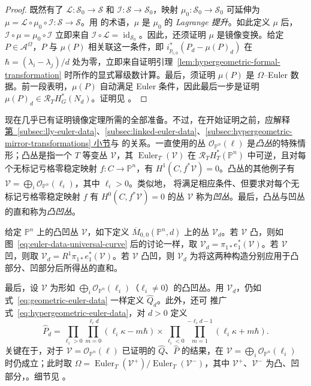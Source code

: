 \begin{proof}
既然有了 $\mathcal L:\mathcal S_0\to\mathcal S$ 和 $\mathcal I:\mathcal S\to\mathcal S_0$，映射 $\mu_0:\mathcal S_0\to\mathcal S_0$ 可延伸为 $\mu=\mathcal L\circ\mu_0\circ\mathcal I:\mathcal S\to\mathcal S$。用  的术语，$\mu$ 是 $\mu_0$ 的 \emph{Lagrange 提升}。如此定义 $\mu$ 后，$\mathcal I\circ\mu=\mu_0\circ\mathcal I$ 立即来自 $\mathcal I\circ\mathcal L=\operatorname{id}_{\mathcal S_0}$。因此，还须证明 $\mu$ 是镜像变换。给定 $P\in\mathcal A^\Omega$，$P$ 与 $\mu(P)$ 相关联这一条件，即 $i_{p_{i,0}}^*(P_d-\mu(P)_d)$ 在 $\hbar=(\lambda_i-\lambda_j)/d$ 处为零，立即来自证明引理~\ref{lem:hypergeometric-formal-transformation} 时所作的显式幂级数计算。最后，须证明 $\mu(P)$ 是 $\Omega$--Euler 数据。前一段表明，$\mu(P)$ 自动满足 Euler 条件，因此最后一步是证明 $\mu(P)_d\in\mathcal R_TH_G^*(N_d)$。证明见 。
\end{proof}

现在几乎已有证明镜像定理所需的全部准备。不过，在开始证明之前，应解释\hyperref[subsec:lly-euler-data]{第~\ref*{subsec:lly-euler-data}}、\hyperref[subsec:linked-euler-data]{\ref*{subsec:linked-euler-data}}、\hyperref[subsec:hypergeometric-mirror-transformations]{\ref*{subsec:hypergeometric-mirror-transformations} 小节}与  的关系。一直使用的丛 $\mathcal O_{\mathbb P^n}(\ell)$ 是\emph{凸丛}的特殊情形；凸丛是指一个 $T$ 等变丛 $\mathcal V$，其 $\operatorname{Euler}_T(\mathcal V)$ 在 $\mathcal R_TH_T^*(\mathbb P^n)$ 中可逆，且对每个无标记亏格零稳定映射 $f:C\to\mathbb P^n$，有 $H^1(C,f^*\mathcal V)=0$。凸丛的其他例子有 $\mathcal V=\bigoplus_i\mathcal O_{\mathbb P^n}(\ell_i)$，其中 $\ell_i>0$。类似地， 将满足相应条件、但要求对每个无标记亏格零稳定映射 $f$ 有 $H^0(C,f^*\mathcal V)=0$ 的丛 $\mathcal V$ 称为\emph{凹丛}。最后，凸丛与凹丛的直和称为\emph{凸凹丛}。

给定 $\mathbb P^n$ 上的凸凹丛 $\mathcal V$，如下定义 $\overline M_{0,0}(\mathbb P^n,d)$ 上的丛 $\mathcal V_d$。若 $\mathcal V$ 凸，则如图~\eqref{eq:euler-data-universal-curve} 后的讨论一样，取 $\mathcal V_d=\pi_{1*}e_1^*(\mathcal V)$。若 $\mathcal V$ 凹，则取 $\mathcal V_d=R^1\pi_{1*}e_1^*(\mathcal V)$。若 $\mathcal V$ 凸凹，则 $\mathcal V_d$ 为将这两种构造分别应用于凸部分、凹部分后所得丛的直和。

最后，设 $\mathcal V$ 为形如 $\bigoplus_i\mathcal O_{\mathbb P^n}(\ell_i)$（$\ell_i\ne0$）的凸凹丛。用 $\mathcal V_d$，仍如式~\eqref{eq:geometric-euler-data} 一样定义 $\widehat Q_d$。此外，还可
推广式~\eqref{eq:hypergeometric-euler-data}，对 $d>0$ 定义
\begin{equation}\label{eq:concavex-hypergeometric-euler-data}
\widehat P_d=
\prod_{\ell_i>0}\prod_{m=0}^{\ell_i d}(\ell_i\kappa-m\hbar)
\times\prod_{\ell_i<0}\prod_{m=1}^{-\ell_i d-1}(\ell_i\kappa+m\hbar).
\end{equation}
关键在于，对于 $\mathcal V=\mathcal O_{\mathbb P^n}(\ell)$ 已证明的 $\widehat Q$、$\widehat P$ 的结果，在 $\mathcal V=\bigoplus_i\mathcal O_{\mathbb P^n}(\ell_i)$ 时仍成立；此时取 $\Omega=\operatorname{Euler}_T(\mathcal V^+)/\operatorname{Euler}_T(\mathcal V^-)$，其中 $\mathcal V^+$、$\mathcal V^-$ 为凸、凹部分，。细节见 。
